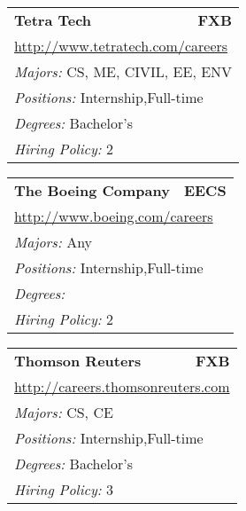 \documentclass[twoside]{article}
\begin{document}
\begin{center}
\begin{multicols}{3}
\begin{FlushLeft}
\begin{minipage}{.9\columnwidth}
\end{minipage}
 
\begin{minipage}{.9\columnwidth}\begin{tabularx}{.95\columnwidth}{Xr}
                 {\Large\bf Tetra Tech} & {\Large\bf FXB}\\
    \multicolumn{2}{p{.95\columnwidth}}{\url{http://www.tetratech.com/careers}}\\
    \multicolumn{2}{p{.95\columnwidth}}{\emph{Majors:} CS, ME, CIVIL, EE, ENV}\\
    \multicolumn{2}{p{.95\columnwidth}}{\emph{Positions:} Internship,Full-time}\\
    \multicolumn{2}{p{.95\columnwidth}}{\emph{Degrees:} Bachelor's}\\
    \multicolumn{2}{p{.95\columnwidth}}{\emph{Hiring Policy:} 2}\\
    \end{tabularx}
    
\end{minipage}
 
\begin{minipage}{.9\columnwidth}\begin{tabularx}{.95\columnwidth}{Xr}
                 {\Large\bf The Boeing Company} & {\Large\bf EECS}\\
    \multicolumn{2}{p{.95\columnwidth}}{\url{http://www.boeing.com/careers}}\\
    \multicolumn{2}{p{.95\columnwidth}}{\emph{Majors:} Any}\\
    \multicolumn{2}{p{.95\columnwidth}}{\emph{Positions:} Internship,Full-time}\\
    \multicolumn{2}{p{.95\columnwidth}}{\emph{Degrees:} }\\
    \multicolumn{2}{p{.95\columnwidth}}{\emph{Hiring Policy:} 2}\\
    \end{tabularx}
    
\end{minipage}
 
\begin{minipage}{.9\columnwidth}\begin{tabularx}{.95\columnwidth}{Xr}
                 {\Large\bf Thomson Reuters} & {\Large\bf FXB}\\
    \multicolumn{2}{p{.95\columnwidth}}{\url{http://careers.thomsonreuters.com}}\\
    \multicolumn{2}{p{.95\columnwidth}}{\emph{Majors:} CS, CE}\\
    \multicolumn{2}{p{.95\columnwidth}}{\emph{Positions:} Internship,Full-time}\\
    \multicolumn{2}{p{.95\columnwidth}}{\emph{Degrees:} Bachelor's}\\
    \multicolumn{2}{p{.95\columnwidth}}{\emph{Hiring Policy:} 3}\\
    \end{tabularx}
    

\end{minipage}
\end{FlushLeft}
\end{multicols}
\end{center}
\end{document}
